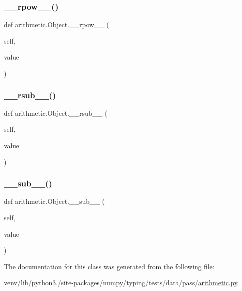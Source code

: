 \mbox{\label{classarithmetic_1_1Object_a9aeaf30e1feb91ddabdec92d883059b3}} 
\subsubsection{\texorpdfstring{\+\_\+\+\_\+rpow\+\_\+\+\_\+()}{\_\_rpow\_\_()}}
{\footnotesize\ttfamily def arithmetic.\+Object.\+\_\+\+\_\+rpow\+\_\+\+\_\+ (\begin{DoxyParamCaption}\item[{}]{self,  }\item[{}]{value }\end{DoxyParamCaption})}

\mbox{\label{classarithmetic_1_1Object_a8d1eb75c8b6bf36295114638f8c6436d}} 
\subsubsection{\texorpdfstring{\+\_\+\+\_\+rsub\+\_\+\+\_\+()}{\_\_rsub\_\_()}}
{\footnotesize\ttfamily def arithmetic.\+Object.\+\_\+\+\_\+rsub\+\_\+\+\_\+ (\begin{DoxyParamCaption}\item[{}]{self,  }\item[{}]{value }\end{DoxyParamCaption})}

\mbox{\label{classarithmetic_1_1Object_ab6b4d55b42e08f469575ac0c281753c7}} 
\subsubsection{\texorpdfstring{\+\_\+\+\_\+sub\+\_\+\+\_\+()}{\_\_sub\_\_()}}
{\footnotesize\ttfamily def arithmetic.\+Object.\+\_\+\+\_\+sub\+\_\+\+\_\+ (\begin{DoxyParamCaption}\item[{}]{self,  }\item[{}]{value }\end{DoxyParamCaption})}



The documentation for this class was generated from the following file\+:\begin{DoxyCompactItemize}
\item 
venv/lib/python3./site-\/packages/numpy/typing/tests/data/pass/\hyperlink{pass_2arithmetic_8py}{arithmetic.\+py}\end{DoxyCompactItemize}
